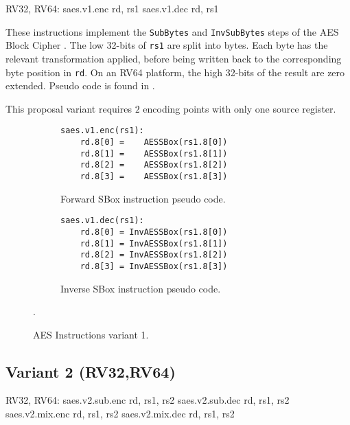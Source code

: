 \begin{cryptoisa}
RV32, RV64:
    saes.v1.enc rd, rs1
    saes.v1.dec rd, rs1
\end{cryptoisa}

These instructions implement the 
{\tt SubBytes} \cite[Section 5.1.1]{nist:fips:197}
and
{\tt InvSubBytes} \cite[Section 5.3.1]{nist:fips:197}
steps of the AES Block Cipher \cite{nist:fips:197}.
The low 32-bits of {\tt rs1} are split into bytes.
Each byte has the relevant transformation applied, before
being written back to the corresponding byte position in {\tt rd}.
On an RV64 platform, the high 32-bits of the result are zero
extended.
Pseudo code is found in 
.

This proposal variant requires $2$ encoding points with only one
source register.

\begin{figure}
\begin{subfigure}[b]{0.5\textwidth}
\begin{lstlisting}[language=pseudo]
saes.v1.enc(rs1):
    rd.8[0] =    AESSBox(rs1.8[0])
    rd.8[1] =    AESSBox(rs1.8[1])
    rd.8[2] =    AESSBox(rs1.8[2])
    rd.8[3] =    AESSBox(rs1.8[3])
\end{lstlisting}
\caption{Forward SBox instruction pseudo code.}
\label{fig:pseudo:aes:v1:sub:enc}
\end{subfigure}
\begin{subfigure}[b]{0.5\textwidth}
\begin{lstlisting}[language=pseudo]
saes.v1.dec(rs1):
    rd.8[0] = InvAESSBox(rs1.8[0])
    rd.8[1] = InvAESSBox(rs1.8[1])
    rd.8[2] = InvAESSBox(rs1.8[2])
    rd.8[3] = InvAESSBox(rs1.8[3])
\end{lstlisting}
\label{fig:pseudo:aes:v1:sub:dec}
\caption{Inverse SBox instruction pseudo code.}
\end{subfigure}
\caption{AES Instructions variant 1.}
\label{fig:pseudo:aes:v1}.
\end{figure}

\newpage
\subsection{Variant 2 (RV32,RV64)}

\begin{cryptoisa}
RV32, RV64:
    saes.v2.sub.enc    rd, rs1, rs2
    saes.v2.sub.dec    rd, rs1, rs2
    saes.v2.mix.enc    rd, rs1, rs2
    saes.v2.mix.dec    rd, rs1, rs2
\end{cryptoisa}

